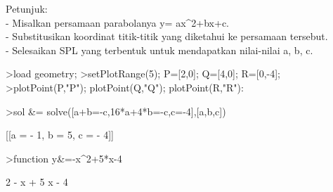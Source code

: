\documentclass[a4paper,10pt]{article}
\begin{document}
\begin{eulernotebook}
\begin{eulercomment}
\begin{eulercomment}
\begin{eulercomment}
\begin{eulercomment}
\begin{eulercomment}
\begin{eulercomment}
\begin{eulercomment}
\begin{eulercomment}
\begin{eulercomment}
\begin{eulercomment}
\begin{eulercomment}
\begin{eulercomment}
\begin{eulercomment}
\begin{eulercomment}
\begin{eulercomment}
\begin{eulercomment}
\begin{eulercomment}
\begin{eulercomment}
\begin{eulercomment}
Petunjuk:\\
- Misalkan persamaan parabolanya y= ax\textasciicircum{}2+bx+c.\\
- Substitusikan koordinat titik-titik yang diketahui ke persamaan
tersebut.\\
- Selesaikan SPL yang terbentuk untuk mendapatkan nilai-nilai a, b, c.
\end{eulercomment}
\begin{eulerprompt}
>load geometry;
>setPlotRange(5); P=[2,0]; Q=[4,0]; R=[0,-4];
>plotPoint(P,"P"); plotPoint(Q,"Q"); plotPoint(R,"R"):
\end{eulerprompt}
\begin{eulerprompt}
>sol &= solve([a+b=-c,16*a+4*b=-c,c=-4],[a,b,c])
\end{eulerprompt}
\begin{euleroutput}
  
                       [[a = - 1, b = 5, c = - 4]]
  
\end{euleroutput}
\begin{eulerprompt}
>function y&=-x^2+5*x-4
\end{eulerprompt}
\begin{euleroutput}
  
                                 2
                              - x  + 5 x - 4
  

\end{euleroutput}
\end{eulercomment}
\end{eulercomment}
\end{eulercomment}
\end{eulercomment}
\end{eulercomment}
\end{eulercomment}
\end{eulercomment}
\end{eulercomment}
\end{eulercomment}
\end{eulercomment}
\end{eulercomment}
\end{eulercomment}
\end{eulercomment}
\end{eulercomment}
\end{eulercomment}
\end{eulercomment}
\end{eulercomment}
\end{eulercomment}
\end{eulernotebook}
\end{document}
